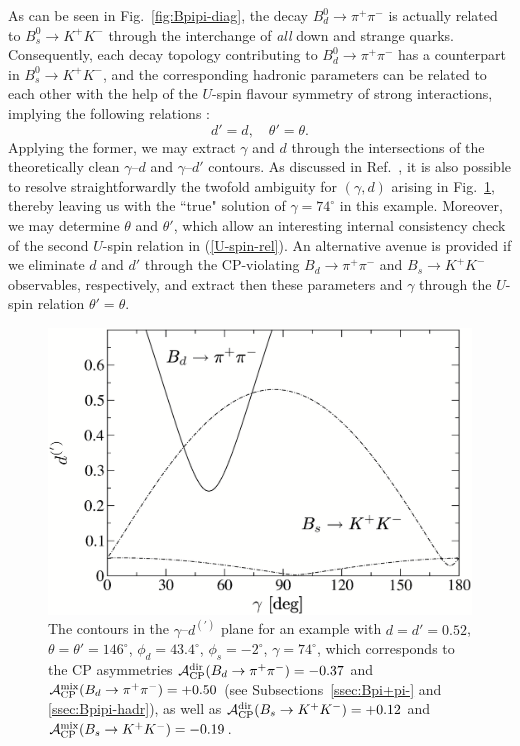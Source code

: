 \documentclass[12pt]{article}
\begin{document}
As can be seen in Fig.~\ref{fig:Bpipi-diag}, the decay 
$B^0_d\to\pi^+\pi^-$ is actually related to $B^0_s\to K^+K^-$ through the interchange 
of {\it all} down and strange quarks. Consequently, each decay topology contributing
to $B^0_d\to\pi^+\pi^-$ has a counterpart in $B^0_s\to K^+K^-$, and
the corresponding hadronic parameters can be related to each other
with the help of the $U$-spin flavour symmetry of strong interactions,
implying the following relations \cite{RF-BsKK}:
\begin{equation}\label{U-spin-rel}
d'=d, \quad \theta'=\theta.
\end{equation}
Applying the former, we may extract $\gamma$ and $d$ through the 
intersections of the theoretically clean $\gamma$--$d$ and $\gamma$--$d'$ 
contours. As discussed in Ref.~\cite{RF-BsKK}, it is also possible to resolve 
straightforwardly the 
twofold ambiguity for $(\gamma,d)$ arising in Fig.~\ref{fig:Bs-Bd-contours},
thereby leaving us with the ``true" solution of $\gamma=74^\circ$ in
this example. Moreover, we may determine $\theta$ and $\theta'$, which
allow an interesting internal consistency check of the second $U$-spin relation 
in (\ref{U-spin-rel}). An alternative avenue is provided if we eliminate $d$ and 
$d'$ through the CP-violating $B_d\to\pi^+\pi^-$ and $B_s\to K^+K^-$
observables, respectively, and extract then these parameters and $\gamma$ 
through the $U$-spin relation $\theta'=\theta$.


\begin{figure}[t]
   \centering
   \includegraphics[width=7.4truecm]{Bs-Bd-contours.ps} 
   \vspace*{-0.6truecm}
   \caption{The contours in the $\gamma$--$d^{(')}$ plane for an example with
   $d=d'=0.52$, $\theta=\theta'=146^\circ$, $\phi_d=43.4^\circ$, $\phi_s=-2^\circ$,
   $\gamma=74^\circ$, which corresponds to the CP asymmetries
   ${\cal A}_{\rm CP}^{\rm dir}(B_d\to\pi^+\pi^-)=-0.37$ and 
   ${\cal A}_{\rm CP}^{\rm mix}(B_d\to\pi^+\pi^-)=+0.50$
   (see Subsections~\ref{ssec:Bpi+pi-} and \ref{ssec:Bpipi-hadr}), as well as
   ${\cal A}_{\rm CP}^{\rm dir}(B_s\to K^+K^-)=+0.12$ and
   ${\cal A}_{\rm CP}^{\rm mix}(B_s\to K^+K^-)=-0.19$.}\label{fig:Bs-Bd-contours}
\end{figure}
\end{document}
